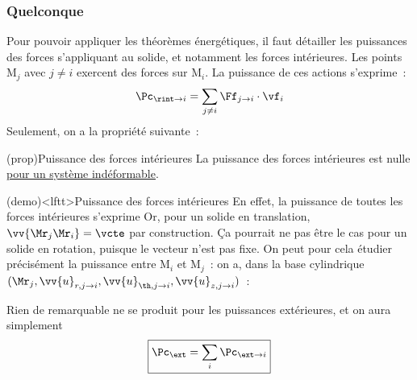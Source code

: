 \documentclass[../../main/main.tex]{subfiles}
\begin{document}
\subsubsection{Quelconque}
Pour pouvoir appliquer les théorèmes énergétiques, il faut détailler les
puissances des forces s'appliquant au solide, et notamment les forces
intérieures. Les points M$_j$ avec $j\neq i$ exercent des forces sur M$_i$. La
puissance de ces actions s'exprime~:
\[\Pc_{\rint\to i} = \sum_{j\neq i} \Ff_{j\to i}\cdot\vf_i\]
Seulement, on a la propriété suivante~:
\begin{tcb*}(prop){Puissance des forces intérieures}
	La puissance des forces intérieures est nulle \ul{pour un système
		indéformable}.
\end{tcb*}
\begin{tcb*}[breakable](demo)<lftt>{Puissance des forces intérieures}
	En effet, la puissance de toutes les forces intérieures s'exprime
	\psw{
		\[
			\Pc_{\rint} =
			\sum_i\Pc_{\rint\to i} =
			\sum_i\sum_{j\neq i}\Ff_{j\to i}\cdot \vf_i =
			\sum_i\sum_{j\neq i}\Ff_{j\to i}\cdot \dv{\vv{\Mr_j\Mr_i}}{t}
		\]
	}%
	Or, pour un solide en translation, $\vv{\Mr_j\Mr_i} = \vcte$ par construction.
	Ça pourrait ne pas être le cas pour un solide en rotation, puisque le vecteur
	n'est pas fixe. On peut pour cela étudier précisément la puissance entre
	M$_i$ et M$_j$~: on a, dans la base cylindrique $(\Mr_j, \vv{u}_{r,j\to i},
		\vv{u}_{\th,j\to i}, \vv{u}_{z,j\to i})$~:
	\vspace{-15pt}
\end{tcb*}
Rien de remarquable ne se produit pour les puissances extérieures, et on aura
simplement
\[
	\boxed{\Pc_{\ext} = \sum_i \Pc_{\ext\to i}}
\]
\end{document}
